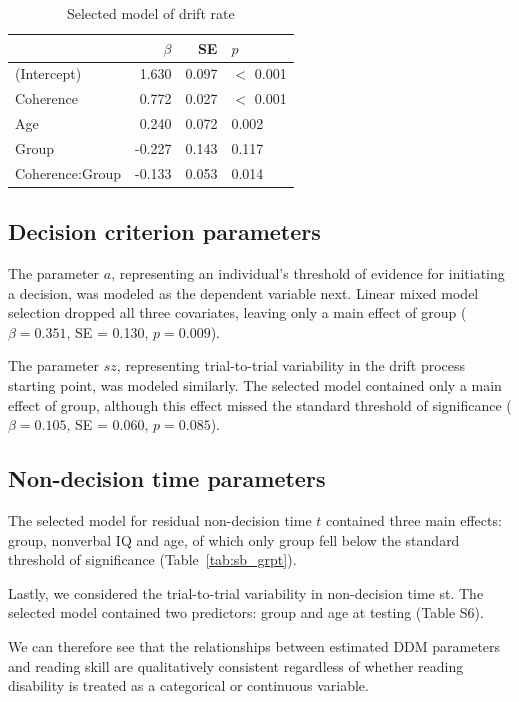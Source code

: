 \documentclass[..\uwthesis.tex]{subfiles}
\begin{document}
\begin{table}
\centering
\caption{Selected model of drift rate}
\label{tab:sb_grpdrift}
    \begin{tabular}{lrrl}
    \toprule
      & $\beta$ & SE & $p$\\
    \midrule
    (Intercept)      & 1.630  & 0.097 & $<$ 0.001\\
    Coherence        & 0.772  & 0.027 & $<$ 0.001\\
    Age              & 0.240  & 0.072 & 0.002\\
    Group            & -0.227 & 0.143 & 0.117\\
    Coherence:Group  & -0.133 & 0.053 & 0.014\\
    \bottomrule
    \end{tabular}
\end{table}

\subsection{Decision criterion parameters} The parameter $a$, representing an individual’s threshold of evidence for initiating a decision, was modeled as the dependent variable next. Linear mixed model selection dropped all three covariates, leaving only a main effect of group ($\beta = 0.351$, SE = 0.130, $p = 0.009$). 

The parameter $sz$, representing trial-to-trial variability in the drift process starting point, was modeled similarly. The selected model contained only a main effect of group, although this effect missed the standard threshold of significance ($\beta = 0.105$, SE = 0.060, $p = 0.085$).

\subsection{Non-decision time parameters} The selected model for residual non-decision time $t$ contained three main effects: group, nonverbal IQ and age, of which only group fell below the standard threshold of significance (Table~\ref{tab:sb_grpt}). 

Lastly, we considered the trial-to-trial variability in non-decision time st. The selected model contained two predictors: group and age at testing (Table S6). 

We can therefore see that the relationships between estimated DDM parameters and reading skill are qualitatively consistent regardless of whether reading disability is treated as a categorical or continuous variable. 
 
\end{document}
